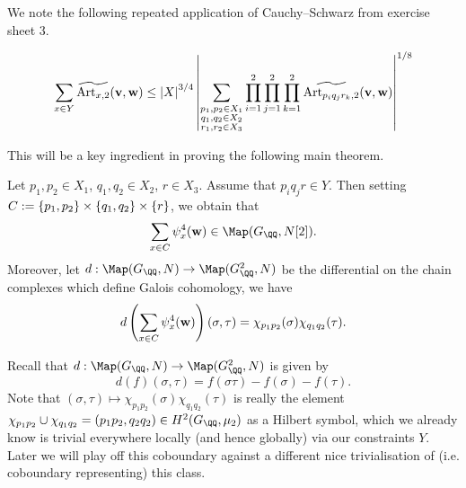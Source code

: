 \documentclass{lecturenotes}
\newcommand{\Art}{\operatorname{Art}}
\newcommand{\bv}{\mathbf{v}}
\newcommand{\bw}{\mathbf{w}}
\numberwithin{equation}{section}
\begin{document}
We note the following repeated application of Cauchy--Schwarz from exercise sheet 3.

\begin{lemma}\label{lem:repeatedCS}
    \[\sum_{x\in Y}\widetilde{\Art_{x,2}}(\bv,\bw)\leq \abs{X}^{3/4}\abs{\sum_{\substack{p_1,p_2\in X_1\\q_1,q_2\in X_2\\r_1,r_2\in X_3}}\prod_{i=1}^2\prod_{j=1}^2\prod_{k=1}^2\widetilde{\Art_{p_iq_jr_k,2}}(\bv,\bw)}^{1/8}\]
\end{lemma}

This will be a key ingredient in proving the following main theorem.

\begin{theorem}\label{thm:1}
    Let $p_1,p_2\in X_1$, $q_1,q_2\in X_2$, $r\in X_3$.  Assume that $p_iq_jr\in Y$.  Then setting $C:=\left\{{p_1,p_2}\right\}\times \left\{{q_1,q_2}\right\}\times \left\{{r}\right\}$, we obtain that
    \[\sum_{x\in C}\psi_x^4(\bw)\in \Map(G_\QQ,N[2]).\]
    Moreover, let $d:\Map(G_\QQ, N)\to \Map(G_\QQ^2,N)$ be the differential on the chain complexes which define Galois cohomology, we have
    \[d\braces{\sum_{x\in C}\psi_x^4(\bw)}(\sigma,\tau)=\chi_{p_1p_2}(\sigma)\chi_{q_1q_2}(\tau).\]
\end{theorem}
\begin{rem}
    Recall that $d:\Map(G_\QQ, N)\to \Map(G_\QQ^2, N)$ is given by
    \[d(f)(\sigma,\tau)=f(\sigma\tau)-f(\sigma)-f(\tau).\]
    Note that $(\sigma,\tau)\mapsto \chi_{p_1p_2}(\sigma)\chi_{q_1q_2}(\tau)$ is really the element $\chi_{p_1p_2}\cup\chi_{q_1q_2}=(p_1p_2,q_2q_2)\in H^2(G_\QQ,\mu_2)$ as a Hilbert symbol, which we already know is trivial everywhere locally (and hence globally) via our constraints $Y$.  Later we will play off this coboundary against a different nice trivialisation of (i.e. coboundary representing) this class.
\end{rem}
\end{document}
